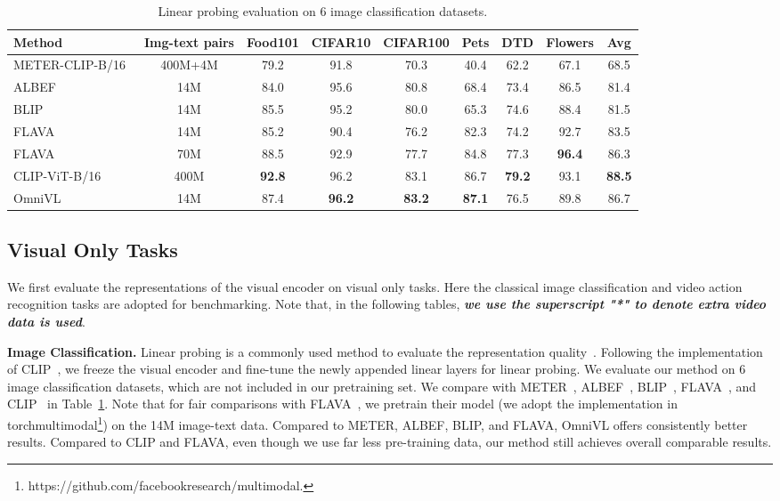 \documentclass{article}
\makeatletter
\newcommand*{\system}{OmniVL\@\xspace}
\makeatother
\begin{document}
\begin{table}[t]
  \caption{Linear probing evaluation on 6 image classification datasets.}
  \label{tab:linear}
  \small
  \centering
\setlength{\tabcolsep}{4pt} 
  \begin{tabular*}{\linewidth}{@{\extracolsep{\fill}}lc|ccccccc@{}}
    \toprule
    \textbf{Method} & \textbf{Img-text pairs} & Food101 & CIFAR10 & CIFAR100 &
    Pets & DTD & Flowers & Avg \\
    \midrule
    METER-CLIP-B/16~\cite{dou2021empirical} & 400M+4M & 79.2 &	91.8 & 70.3 & 40.4 & 62.2 & 67.1 & 68.5\\
    ALBEF~\cite{li2021align} & 14M & 84.0 & 95.6 & 80.8 & 68.4 & 73.4 & 86.5 & 81.4\\
    BLIP~\cite{li2022blip} & 14M & 85.5	& 95.2 & 80.0 & 65.3 & 74.6 & 88.4 & 81.5\\
    FLAVA~\cite{singh2021flava} & 14M & 85.2 & 90.4 & 76.2 & 82.3 & 74.2 & 92.7 & 83.5 \\
    FLAVA~\cite{singh2021flava} & 70M & 88.5 & 92.9 & 77.7 & 84.8 & 77.3 & \textbf{96.4} & 86.3 \\
    CLIP-ViT-B/16 & 400M & \textbf{92.8} & 96.2 & 83.1 & 86.7 & \textbf{79.2} & 93.1 & \textbf{88.5} \\
\system & 14M & 87.4 & \textbf{96.2} & \textbf{83.2} & \textbf{87.1} & 76.5 & 89.8 & 86.7\\
    \bottomrule
  \end{tabular*}
\end{table}



\subsection{Visual Only Tasks}
\label{sec:visual}
We first evaluate the representations of the visual encoder on visual only tasks. Here the classical image classification and video action recognition tasks are adopted for benchmarking. Note that, in the following tables, \textbf{\textit{we use the superscript "*" to denote extra video data is used}}.

\noindent \textbf{Image Classification.}
Linear probing is a commonly used method to evaluate the representation quality~\cite{radford2021learning,yuan2021florence,singh2021flava}. Following the implementation of CLIP~\cite{radford2021learning}, we freeze the visual encoder and fine-tune the newly appended linear layers for linear probing. We evaluate our method on 6 image classification datasets, which are not included in our pretraining set. We compare with METER~\cite{dou2021empirical}, ALBEF~\cite{li2021align}, BLIP~\cite{li2022blip}, FLAVA~\cite{singh2021flava}, and CLIP~\cite{radford2021learning} in Table~\ref{tab:linear}. Note that for fair comparisons with FLAVA~\cite{singh2021flava}, we pretrain their model (we adopt the implementation in torchmultimodal\footnote{https://github.com/facebookresearch/multimodal.}) on the 14M image-text data. Compared to METER, ALBEF, BLIP, and FLAVA, \system offers consistently better results. Compared to CLIP and FLAVA, even though we use far less pre-training data, our method still achieves overall comparable results. 
\end{document}

